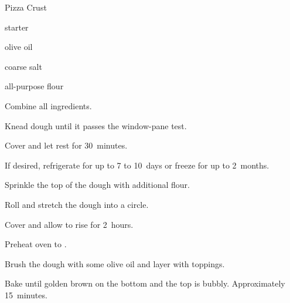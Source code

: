 \begin{recipe}{Pizza Crust}{}{}

\begin{ingredients}
\item {} starter
\item {} olive oil
\item {} coarse salt
\item {} all-purpose flour
\end{ingredients}

\begin{directions}
\item Combine all ingredients.
\item Knead dough until it passes the window-pane test.
\item Cover and let rest for 30~minutes.
\item If desired, refrigerate for up to 7 to 10~days or freeze for up to 2~months.
\item Sprinkle the top of the dough with additional flour.
\item Roll and stretch the dough into a circle.
\item Cover and allow to rise for 2~hours.
\item Preheat oven to .
\item Brush the dough with some olive oil and layer with toppings.
\item Bake until golden brown on the bottom and the top is bubbly. Approximately 15~minutes.
\end{directions}
\end{recipe}
